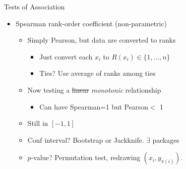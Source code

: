 \begin{frame}{Tests of Association}
    \begin{itemize}
        \item Spearman rank-order coefficient (non-parametric)
        \begin{itemize}
            \item Simply Pearson, but data are converted to ranks
            \begin{itemize}
                \item Just convert each $x_i$ to $R(x_i)\in\{1,\ldots,n\}$
                \item Ties? Use average of ranks among ties
            \end{itemize}
            \item Now testing a \sout{linear} \textit{monotonic} relationship
            \begin{itemize}
                \item Can have Spearman=1 but Pearson$<$ 1
            \end{itemize}
            \item Still in $[-1,1]$
            \item Conf interval? Bootstrap or Jackknife. $\exists$ packages
            \item $p$-value? Permutation test, redrawing $(x_i,y_{\pi(i)})$.
        \end{itemize}
    \end{itemize}
\end{frame}

